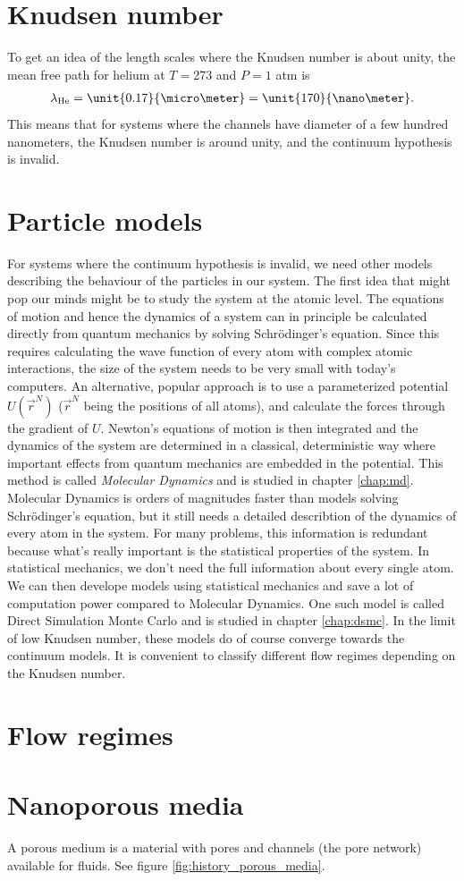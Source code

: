 \section{Knudsen number}
\label{sec:knudsen_number}
To get an idea of the length scales where the Knudsen number is about unity, the mean free path for helium at $T=$\unit{273}{\kelvin} and $P=1$ atm is\cite{lillestol2001generell} 
\begin{align}
	\label{eq:helium_mfp}
	\lambda_{\text{He}} = \unit{0.17}{\micro\meter} = \unit{170}{\nano\meter}.
\end{align}
This means that for systems where the channels have diameter of a few hundred nanometers, the Knudsen number is around unity, and the continuum hypothesis is invalid. 

\section{Particle models}
\label{sec:theory_of_fluids_atomic_models}
For systems where the continuum hypothesis is invalid, we need other models describing the behaviour of the particles in our system. The first idea that might pop our minds might be to study the system at the atomic level. The equations of motion and hence the dynamics of a system can in principle be calculated directly from quantum mechanics by solving Schr\"{o}dinger's equation. Since this requires calculating the wave function of every atom with complex atomic interactions, the size of the system needs to be very small with today's computers. An alternative, popular approach is to use a parameterized potential $U(\vec r^N)$ ($\vec r^N$ being the positions of all atoms), and calculate the forces through the gradient of $U$. Newton's equations of motion is then integrated and the dynamics of the system are determined in a classical, deterministic way where important effects from quantum mechanics are embedded in the potential. This method is called \textit{Molecular Dynamics} and is studied in chapter \ref{chap:md}. Molecular Dynamics is orders of magnitudes faster than models solving Schr\"{o}dinger's equation, but it still needs a detailed describtion of the dynamics of every atom in the system. For many problems, this information is redundant because what's really important is the statistical properties of the system. In statistical mechanics, we don't need the full information about every single atom. We can then develope models using statistical mechanics and save a lot of computation power compared to Molecular Dynamics. One such model is called Direct Simulation Monte Carlo and is studied in chapter \ref{chap:dsmc}. In the limit of low Knudsen number, these models do of course converge towards the continuum models. It is convenient to classify different flow regimes depending on the Knudsen number.
\section{Flow regimes}

\section{Nanoporous media}
\label{sec:nanoporous_media}
A porous medium is a material with pores and channels (the pore network) available for fluids. See figure \ref{fig:history_porous_media}. 
